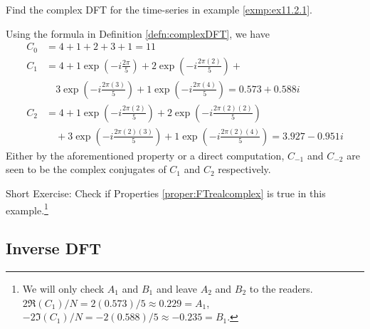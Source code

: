 \begin{exmp}
\label{exmp:ex11.2.2}
Find the complex DFT for the time-series in example \ref{exmp:ex11.2.1}.
\end{exmp}
\begin{solution}
Using the formula in Definition \ref{defn:complexDFT}, we have
\begin{align*}
C_0 &= 4+1+2+3+1 = 11 \\
C_1 &= 4 + 1\exp(-i\frac{2\pi}{5}) + 2\exp(-i\frac{2\pi(2)}{5}) + \\
&\quad 3\exp(-i\frac{2\pi(3)}{5}) + 1\exp(-i\frac{2\pi(4)}{5}) = 0.573 + 0.588i \\
C_2 &= 4 + 1\exp(-i\frac{2\pi(2)}{5}) + 2\exp(-i\frac{2\pi(2)(2)}{5}) \\
&\quad+ 3\exp(-i\frac{2\pi(2)(3)}{5}) + 1\exp(-i\frac{2\pi(2)(4)}{5}) = 3.927 - 0.951i
\end{align*}
Either by the aforementioned property or a direct computation, $C_{-1}$ and $C_{-2}$ are seen to be the complex conjugates of $C_1$ and $C_2$ respectively. 
\end{solution}
Short Exercise: Check if Properties \ref{proper:FTrealcomplex} is true in this example.\footnote{We will only check $A_1$ and $B_1$ and leave $A_2$ and $B_2$ to the readers. $2\Re(C_1)/N = 2(0.573)/5 \approx 0.229 = A_1$, $-2\Im(C_1)/N = -2(0.588)/5 \approx -0.235 = B_1$.}

\subsection{Inverse DFT}

